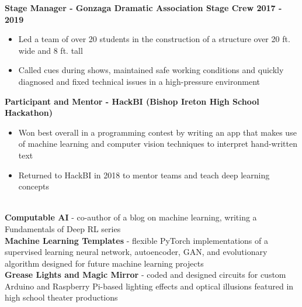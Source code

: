 \documentclass{article}
\begin{document}
\begin{center}
\begin{flushleft}
    \textbf{Stage Manager - Gonzaga Dramatic Association Stage Crew \hfill 2017 - 2019}
    \begin{itemize}
      \itemsep0em
      \item Led a team of over 20 students in the construction of a structure over 20 ft. wide and 8 ft. tall
      \item Called cues during shows, maintained safe working conditions and quickly diagnosed and fixed technical issues in a high-pressure environment
    \end{itemize}

    \textbf{Participant and Mentor - HackBI  (Bishop Ireton High School Hackathon)}
    \begin{itemize}
      \itemsep0em
      \item Won best overall in a programming contest by writing an app that makes use of machine learning and computer vision techniques to interpret hand-written text
      \item Returned to HackBI in 2018 to mentor teams and teach deep learning concepts
    \end{itemize}


    {\large\textbf{\underline{}}} \\
    \textbf{Computable AI} - co-author of a blog on machine learning, writing a Fundamentals of Deep RL series \\
    \textbf{Machine Learning Templates} - flexible PyTorch implementations of a supervised learning neural network, autoencoder, GAN, and evolutionary algorithm designed for future machine learning projects \\
    \textbf{Grease Lights and Magic Mirror} - coded and designed circuits for custom Arduino and Raspberry Pi-based lighting effects and optical illusions featured in high school theater productions

  \end{flushleft}
  \end{center}
\end{document}
